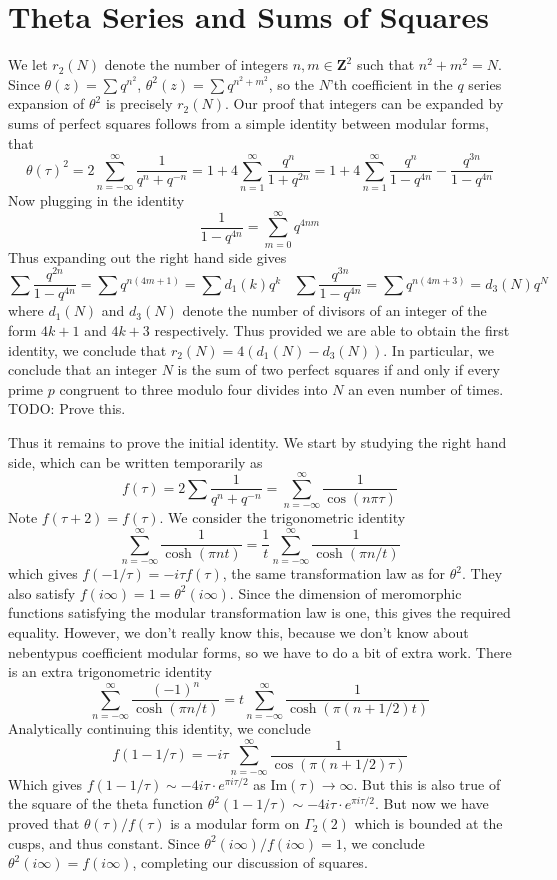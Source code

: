 \documentclass{article}
\theoremstyle{plain}
\theoremstyle{remark}
\theoremstyle{definition}
\begin{document}
\section{Theta Series and Sums of Squares}

We let $r_2(N)$ denote the number of integers $n,m \in \mathbf{Z}^2$ such that $n^2 + m^2 = N$. Since $\theta(z) = \sum q^{n^2}$, $\theta^2(z) = \sum q^{n^2 + m^2}$, so the $N$'th coefficient in the $q$ series expansion of $\theta^2$ is precisely $r_2(N)$. Our proof that integers can be expanded by sums of perfect squares follows from a simple identity between modular forms, that
%
\[ \theta(\tau)^2 = 2 \sum_{n = -\infty}^\infty \frac{1}{q^n + q^{-n}} = 1 + 4 \sum_{n = 1}^\infty \frac{q^{n}}{1 + q^{2n}} = 1 + 4 \sum_{n = 1}^\infty \frac{q^n}{1 - q^{4n}} - \frac{q^{3n}}{1 - q^{4n}} \]
%
Now plugging in the identity
%
\[ \frac{1}{1 - q^{4n}} = \sum_{m = 0}^\infty q^{4nm} \]
%
Thus expanding out the right hand side gives
%
\[ \sum \frac{q^{2n}}{1 - q^{4n}} = \sum q^{n(4m + 1)} = \sum d_1(k) q^k\ \ \ \ \sum \frac{q^{3n}}{1 - q^{4n}} = \sum q^{n(4m + 3)} = d_3(N) q^N \]
%
where $d_1(N)$ and $d_3(N)$ denote the number of divisors of an integer of the form $4k + 1$ and $4k + 3$ respectively. Thus provided we are able to obtain the first identity, we conclude that $r_2(N) = 4(d_1(N) - d_3(N))$. In particular, we conclude that an integer $N$ is the sum of two perfect squares if and only if every prime $p$ congruent to three modulo four divides into $N$ an even number of times. TODO: Prove this.

Thus it remains to prove the initial identity. We start by studying the right hand side, which can be written temporarily as
%
\[ f(\tau) = 2 \sum \frac{1}{q^n + q^{-n}} = \sum_{n = -\infty}^\infty \frac{1}{\cos(n \pi \tau)} \]
%
Note $f(\tau + 2) = f(\tau)$. We consider the trigonometric identity
%
\[ \sum_{n = -\infty}^\infty \frac{1}{\cosh(\pi n t)} = \frac{1}{t} \sum_{n = -\infty}^\infty \frac{1}{\cosh(\pi n/t)} \]
%
which gives $f(-1/\tau) = -i \tau f(\tau)$, the same transformation law as for $\theta^2$. They also satisfy $f(i \infty) = 1 = \theta^2(i \infty)$. Since the dimension of meromorphic functions satisfying the modular transformation law is one, this gives the required equality. However, we don't really know this, because we don't know about nebentypus coefficient modular forms, so we have to do a bit of extra work. There is an extra trigonometric identity
%
\[ \sum_{n = -\infty}^\infty \frac{(-1)^n}{\cosh(\pi n / t)} = t \sum_{n = -\infty}^\infty \frac{1}{\cosh(\pi(n + 1/2)t)} \]
%
Analytically continuing this identity, we conclude
%
\[ f(1 - 1/\tau) = -i \tau \sum_{n = -\infty}^\infty \frac{1}{\cos(\pi(n + 1/2)\tau)} \]
%
Which gives $f(1 - 1/\tau) \sim -4 i \tau \cdot e^{\pi i \tau/2}$ as $\text{Im}(\tau) \to \infty$. But this is also true of the square of the theta function $\theta^2(1 - 1/\tau) \sim -4i \tau \cdot e^{\pi i \tau/2}$. But now we have proved that $\theta(\tau) / f(\tau)$ is a modular form on $\Gamma_2(2)$ which is bounded at the cusps, and thus constant. Since $\theta^2(i\infty)/f(i\infty) = 1$, we conclude $\theta^2(i\infty) = f(i \infty)$, completing our discussion of squares.
\end{document}

